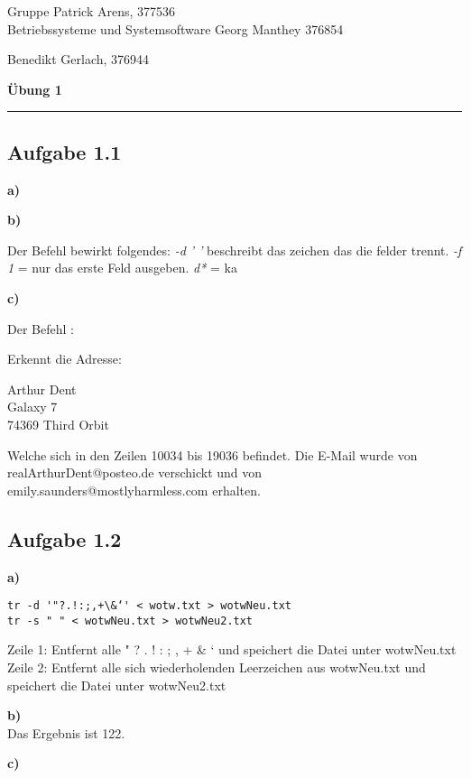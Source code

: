 \documentclass[a4paper,graphics,11pt]{article}
\newcommand{\aufgabe}[1]{\subsection*{Aufgabe #1}}
\begin{document}
\noindent Gruppe              \hfill Patrick Arens, 377536\\
\noindent Betriebssysteme und Systemsoftware    \hfill Georg Manthey 376854\\
\strut\hfill Benedikt Gerlach, 376944\\
\begin{center}
	\LARGE{\textbf{Übung 1}}
\end{center}
\begin{center}
\rule[0.1ex]{\textwidth}{1pt}
\end{center}

\aufgabe{1.1}
\textbf{a)}



\textbf{b)}

Der Befehl bewirkt folgendes: \textit{-d ’ ’} beschreibt das zeichen das die felder trennt. \textit{-f 1} = nur das erste Feld ausgeben. \textit{d*} = ka

\textbf{c)}

Der Befehl :



Erkennt die Adresse:

Arthur Dent\\
Galaxy 7\\
74369 Third Orbit

Welche sich in den Zeilen 10034 bis 19036 befindet. Die E-Mail wurde von realArthurDent@posteo.de verschickt und von emily.saunders@mostlyharmless.com erhalten.\\

\aufgabe{1.2}
\textbf{a)}

\begin{verbatim}
tr -d '"?.!:;,+\&‘' < wotw.txt > wotwNeu.txt
tr -s " " < wotwNeu.txt > wotwNeu2.txt
\end{verbatim}

Zeile 1: Entfernt alle " ? . ! : ; , +  \& ‘  und speichert die Datei unter wotwNeu.txt\\
Zeile 2: Entfernt alle sich wiederholenden Leerzeichen aus wotwNeu.txt und speichert die Datei unter wotwNeu2.txt\\

\newpage

\textbf{b)}\\



Das Ergebnis ist 122.

\textbf{c)}\\
\end{document}
